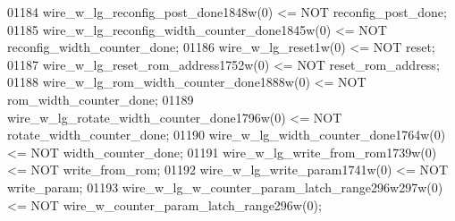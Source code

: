 \begin{DoxyCode}
{01184     \textcolor{vhdlchar}{wire_w_lg_reconfig_post_done1848w}\textcolor{vhdlchar}{(}\textcolor{vhdllogic}{}\textcolor{vhdllogic}{0}\textcolor{vhdlchar}{)} \textcolor{vhdlchar}{<=} \textcolor{keywordflow}{NOT} \textcolor{vhdlchar}{reconfig_post_done};
01185     \textcolor{vhdlchar}{wire_w_lg_reconfig_width_counter_done1845w}\textcolor{vhdlchar}{(}\textcolor{vhdllogic}{}\textcolor{vhdllogic}{0}\textcolor{vhdlchar}{)} \textcolor{vhdlchar}{<=} \textcolor{keywordflow}{NOT} \textcolor{vhdlchar}{
      reconfig_width_counter_done};
01186     \textcolor{vhdlchar}{wire_w_lg_reset1w}\textcolor{vhdlchar}{(}\textcolor{vhdllogic}{}\textcolor{vhdllogic}{0}\textcolor{vhdlchar}{)} \textcolor{vhdlchar}{<=} \textcolor{keywordflow}{NOT} \textcolor{vhdlchar}{reset};
01187     \textcolor{vhdlchar}{wire_w_lg_reset_rom_address1752w}\textcolor{vhdlchar}{(}\textcolor{vhdllogic}{}\textcolor{vhdllogic}{0}\textcolor{vhdlchar}{)} \textcolor{vhdlchar}{<=} \textcolor{keywordflow}{NOT} \textcolor{vhdlchar}{reset_rom_address};
01188     \textcolor{vhdlchar}{wire_w_lg_rom_width_counter_done1888w}\textcolor{vhdlchar}{(}\textcolor{vhdllogic}{}\textcolor{vhdllogic}{0}\textcolor{vhdlchar}{)} \textcolor{vhdlchar}{<=} \textcolor{keywordflow}{NOT} \textcolor{vhdlchar}{rom_width_counter_done};
01189     \textcolor{vhdlchar}{wire_w_lg_rotate_width_counter_done1796w}\textcolor{vhdlchar}{(}\textcolor{vhdllogic}{}\textcolor{vhdllogic}{0}\textcolor{vhdlchar}{)} \textcolor{vhdlchar}{<=} \textcolor{keywordflow}{NOT} \textcolor{vhdlchar}{rotate_width_counter_done};
01190     \textcolor{vhdlchar}{wire_w_lg_width_counter_done1764w}\textcolor{vhdlchar}{(}\textcolor{vhdllogic}{}\textcolor{vhdllogic}{0}\textcolor{vhdlchar}{)} \textcolor{vhdlchar}{<=} \textcolor{keywordflow}{NOT} \textcolor{vhdlchar}{width_counter_done};
01191     \textcolor{vhdlchar}{wire_w_lg_write_from_rom1739w}\textcolor{vhdlchar}{(}\textcolor{vhdllogic}{}\textcolor{vhdllogic}{0}\textcolor{vhdlchar}{)} \textcolor{vhdlchar}{<=} \textcolor{keywordflow}{NOT} \textcolor{vhdlchar}{write_from_rom};
01192     \textcolor{vhdlchar}{wire_w_lg_write_param1741w}\textcolor{vhdlchar}{(}\textcolor{vhdllogic}{}\textcolor{vhdllogic}{0}\textcolor{vhdlchar}{)} \textcolor{vhdlchar}{<=} \textcolor{keywordflow}{NOT} \textcolor{vhdlchar}{write_param};
01193     \textcolor{vhdlchar}{wire_w_lg_w_counter_param_latch_range296w297w}\textcolor{vhdlchar}{(}\textcolor{vhdllogic}{}\textcolor{vhdllogic}{0}\textcolor{vhdlchar}{)} \textcolor{vhdlchar}{<=} \textcolor{keywordflow}{NOT} \textcolor{vhdlchar}{
      wire_w_counter_param_latch_range296w}\textcolor{vhdlchar}{(}\textcolor{vhdllogic}{}\textcolor{vhdllogic}{0}\textcolor{vhdlchar}{)};
}
\end{DoxyCode}
